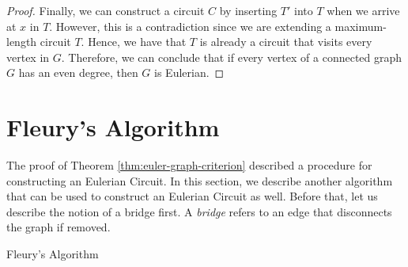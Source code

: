\begin{proof}
  Finally, we can construct a circuit \(C\) by inserting \(T'\) into \(T\) when we arrive at \(x\) in \(T\). However, this is a contradiction since we are extending a maximum-length circuit \(T\). Hence, we have that \(T\) is already a circuit that visits every vertex in \(G\). Therefore, we can conclude that if every vertex of a connected graph \(G\) has an even degree, then \(G\) is Eulerian.
\end{proof}

\section{Fleury's Algorithm}

The proof of Theorem \ref{thm:euler-graph-criterion} described a procedure
for constructing an Eulerian Circuit. In this section, we describe another
algorithm that can be used to construct an Eulerian Circuit as well. Before
that, let us describe the notion of a bridge first. A \textit{bridge} refers to
an edge that disconnects the graph if removed.

\begin{algorithm}
\caption{Fleury's Algorithm}
\label{alg:fleury-algorithm}
\begin{algorithmic}
    \EndIf
  \EndWhile
\end{algorithmic}
\end{algorithm}

